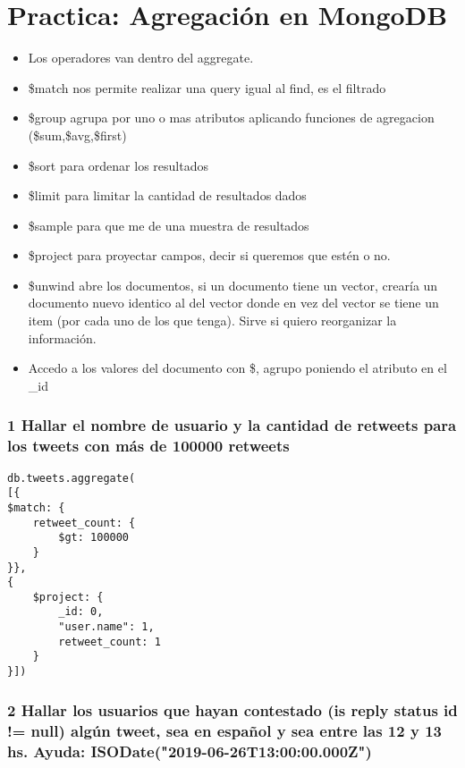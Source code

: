 \section{Practica: Agregación en MongoDB}

\begin{itemize}
\item Los operadores van dentro del aggregate.
\item \$match nos permite realizar una query igual al find, es el filtrado
\item \$group agrupa por uno o mas atributos aplicando funciones de agregacion (\$sum,\$avg,\$first)
\item \$sort para ordenar los resultados
\item \$limit para limitar la cantidad de resultados dados
\item \$sample para que me de una muestra de resultados
\item \$project para proyectar campos, decir si queremos que estén o no.
\item \$unwind abre los documentos, si un documento tiene un vector, crearía un documento nuevo identico al del vector donde en vez del vector se tiene un item (por cada uno de los que tenga). Sirve si quiero reorganizar la información.
\item Accedo a los valores del documento con \$, agrupo poniendo el atributo en el \_id
\end{itemize}



\subsubsection*{1 Hallar el nombre de usuario y la cantidad de retweets para los tweets con más de 100000 retweets}

\begin{verbatim}
db.tweets.aggregate(
[{
$match: {
    retweet_count: {
        $gt: 100000
    }
}},
{
    $project: {
        _id: 0,
        "user.name": 1,
        retweet_count: 1
    }
}])
\end{verbatim}

\subsubsection*{2 Hallar los usuarios que hayan contestado (is reply status id != null) algún tweet, sea en español y sea entre las 12 y 13 hs. Ayuda: ISODate("2019-06-26T13:00:00.000Z")}

